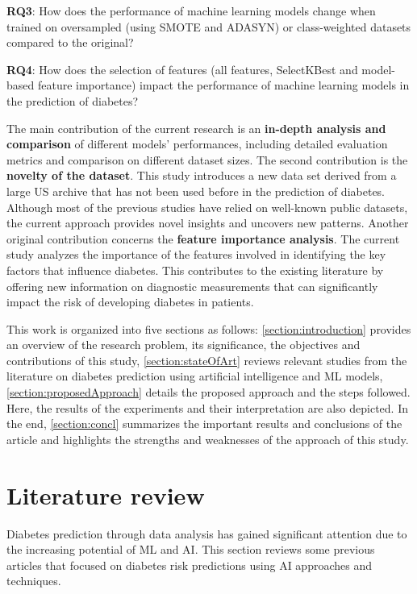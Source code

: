 \documentclass[runningheads]{llncs}
\begin{document}
\textbf{RQ3}: How does the performance of machine learning models change when trained on oversampled (using SMOTE and ADASYN) or class-weighted datasets compared to the original?

\textbf{RQ4}: How does the selection of features (all features, SelectKBest and model-based feature importance) impact the performance of machine learning models in the prediction of diabetes?

 The main contribution of the current research is an \textbf{in-depth analysis and comparison} of different models' performances, including detailed evaluation metrics and comparison on different dataset sizes. 
The second contribution is the \textbf{novelty of the dataset}. This study introduces a new data set derived from a large US archive that has not been used before in the prediction of diabetes. Although most of the previous studies have relied on well-known public datasets, the current approach provides novel insights and uncovers new patterns. 
Another original contribution concerns the \textbf{feature importance analysis}. The current study analyzes the importance of the features involved in identifying the key factors that influence diabetes. This contributes to the existing literature by offering new information on diagnostic measurements that can significantly impact the risk of developing diabetes in patients.

This work is organized into five sections as follows: \autoref{section:introduction} provides an overview of the research problem, its significance, the objectives and contributions of this study, \autoref{section:stateOfArt} reviews relevant studies from the literature on diabetes prediction using artificial intelligence and ML models, \autoref{section:proposedApproach} details the proposed approach and the steps followed. Here, the results of the experiments and their interpretation are also depicted.
In the end, \autoref{section:concl} summarizes the important results and conclusions of the article and highlights the strengths and weaknesses of the approach of this study.

\section{Literature review}
\label{section:stateOfArt}

Diabetes prediction through data analysis has gained significant attention due to the increasing potential of ML and AI. 
This section reviews some previous articles that focused on diabetes risk predictions using AI approaches and techniques.
\end{document}
